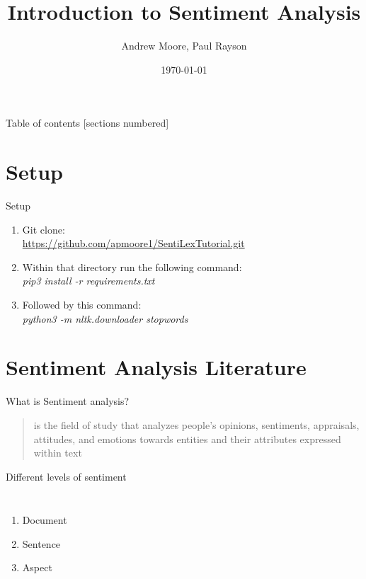\documentclass[10pt]{beamer}
\title{Introduction to Sentiment Analysis}
\author{Andrew Moore, Paul Rayson}
\date{\today}
\institute{School of Computing and Communications, Lancaster University.}
\begin{document}
\maketitle

\begin{frame}{Table of contents}
  [sections numbered]
  \tableofcontents[hideallsubsections]
\end{frame}

\section{Setup}

\begin{frame}{Setup}
\begin{enumerate}
\item Git clone:\\ \url{https://github.com/apmoore1/SentiLexTutorial.git}
\item Within that directory run the following command:\\ \textit{pip3 install -r requirements.txt}
\item Followed by this command:\\ \textit{python3 -m nltk.downloader stopwords}
\end{enumerate}

\end{frame}

\section{Sentiment Analysis Literature}

\begin{frame}[fragile]{What is Sentiment analysis?}
\begin{quote}
is the field of study that analyzes people's opinions, sentiments, appraisals, attitudes, and emotions towards entities and their attributes expressed within text
\end{quote}
\cite{liu2015sentiment}
\end{frame}

\begin{frame}[fragile]{Different levels of sentiment}
\huge
	\begin{columns}[T,onlytextwidth]
          \begin{enumerate}
              \setlength\itemsep{2em}
              \item Document
              \item Sentence 
              \item Aspect
          \end{enumerate}
          \centering
	\end{columns}
\end{frame}
\end{document}
